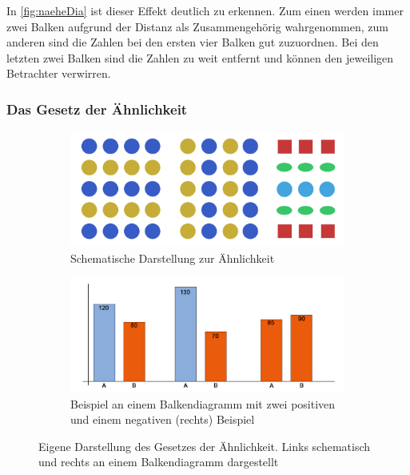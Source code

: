 In \ref{fig:naeheDia} ist dieser Effekt deutlich zu erkennen. 
Zum einen werden immer zwei Balken aufgrund der Distanz als Zusammengehörig wahrgenommen, zum anderen sind die Zahlen bei den ersten vier Balken gut zuzuordnen.
Bei den letzten zwei Balken sind die Zahlen zu weit entfernt und können den jeweiligen Betrachter verwirren.


\subsubsection{Das Gesetz der Ähnlichkeit}
\label{subsub:ähnlich}
\begin{figure}[ht]
\begin{subfigure}{.5\linewidth}
  \centering
  \includegraphics[width=.95\linewidth]{img/gAehnlich}  
  \caption{Schematische Darstellung zur Ähnlichkeit}
  \label{fig:aehnlichSchema}
\end{subfigure}
\begin{subfigure}{.5\linewidth}
  \centering
  \includegraphics[width=.95\linewidth]{img/gAehnlichDia}  
  \caption{Beispiel an einem Balkendiagramm mit zwei positiven und einem negativen (rechts) Beispiel}
  \label{fig:aehnlichDia}
\end{subfigure}
\caption[Gesetz der Ähnlichkeit]{Eigene Darstellung des Gesetzes der Ähnlichkeit. Links schematisch und rechts an einem Balkendiagramm dargestellt}
\label{fig:aehnlich}
\end{figure}

